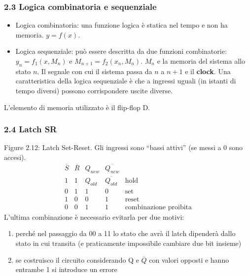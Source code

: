 \documentclass[
]{article}
\providecommand{\tightlist}{%
  \setlength{\itemsep}{0pt}\setlength{\parskip}{0pt}}
\begin{document}
\subsubsection{2.3 Logica combinatoria e
sequenziale}\label{logica-combinatoria-e-sequenziale}

\begin{itemize}
\tightlist
\item
  Logica combinatoria: una funzione logica è statica nel tempo e non ha
  memoria. \(y=f(x)\).
\item
  Logica sequenziale: può essere descritta da due funzioni combinatorie:
  \(y_{n}=f_{1}(x,M_{n})\) e \(M_{n+1}=f_{2}(x_{n},M_{n})\). \(M_{n}\) e
  la memoria del sistema allo stato \(n\). \newline Il segnale con cui
  il sistema passa da \(n\) a \(n+1\) e il \textbf{clock}. Una
  caratteristica della logica sequenziale è che a ingressi uguali (in
  istanti di tempo diversi) possono corrispondere uscite diverse.
\end{itemize}

L'elemento di memoria utilizzato è il flip-flop D.

\subsubsection{2.4 Latch SR}\label{latch-sr}

Figure 2.12: Latch Set-Reset. Gli ingressi sono ``bassi attivi'' (se
messi a 0 sono accesi). \[
\begin{array}{ccccc}\overline{S}&\overline{R}&Q_{new}&\overline{Q_{new}}\\\hline1&1&Q_{old}&\overline{Q_{old}}&\text{hold}\\0&1&1&0&\text{set}\\1&0&0&1&\text{reset}\\0&0&1&1&\text{combinazione proibita}\end{array}
\] L'ultima combinazione è necessario evitarla per due motivi:

\begin{enumerate}
\def\labelenumi{\arabic{enumi}.}
\tightlist
\item
  perché nel passaggio da 00 a 11 lo stato che avrà il latch dipenderà
  dallo stato in cui transita (e praticamente impossibile cambiare due
  bit insieme)
\item
  se costruisco il circuito considerando Q e \(\overline{Q}\) con valori
  opposti e hanno entrambe 1 si introduce un errore
\end{enumerate}
\end{document}
